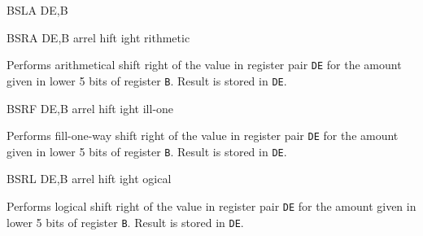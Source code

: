 \documentclass[12pt,twoside,openright,a4paper]{book}
\begin{document}
\begin{basedescript}{
	\desclabelstyle{\multilinelabel}
	\desclabelwidth{3cm}}
\begin{DetailItem}{BSLA DE,B\ZXN}
		\begin{DetailTiming}
		\end{DetailTiming}

	\end{DetailItem}

	\begin{DetailItem}{BSRA DE,B\ZXN}
		{arrel hift ight rithmetic}
		{\SymBSRA}

		Performs arithmetical shift right of the value in register pair {\tt DE} for the amount given in lower 5 bits of register {\tt B}. Result is stored in {\tt DE}.

		\begin{DetailEffects}
			\FlagsBSRA
		\end{DetailEffects}
		
		\begin{DetailTiming}
			\DetailTime{2}{8}
		\end{DetailTiming}

	\end{DetailItem}

	\begin{DetailItem}{BSRF DE,B\ZXN}
		{arrel hift ight ill-one}
		{\SymBSRF}

		Performs fill-one-way shift right of the value in register pair {\tt DE} for the amount given in lower 5 bits of register {\tt B}. Result is stored in {\tt DE}.

		\begin{DetailEffects}
			\FlagsBSRF
		\end{DetailEffects}
		
		\begin{DetailTiming}
		\end{DetailTiming}

	\end{DetailItem}

	\begin{DetailItem}{BSRL DE,B\ZXN}
		{arrel hift ight ogical}
		{\SymBSRL}

		Performs logical shift right of the value in register pair {\tt DE} for the amount given in lower 5 bits of register {\tt B}. Result is stored in {\tt DE}.

		\begin{DetailEffects}
			\FlagsBSRL
		\end{DetailEffects}
		
		\begin{DetailTiming}
			\DetailTime{2}{8}
		\end{DetailTiming}


\end{DetailItem}
\end{basedescript}
\end{document}
